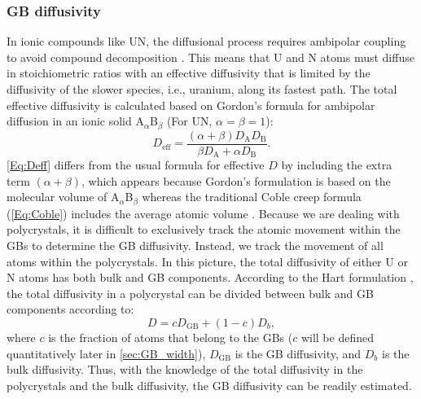 \documentclass[preprint,12pt,sort&compress]{elsarticle} %
\newcommand{\?}{\stackrel{?}{=}}
\providecommand{\DIFaddbegin}{\protect\color{blue}} %
\providecommand{\DIFaddend}{\protect\color{black}} %
\providecommand{\DIFdelbegin}{\protect\color{red}} %
\providecommand{\DIFdelend}{\protect\color{black}} %
\newcommand{\DIFscaledelfig}{0.5}
\newlength{\DIFdelgraphicswidth} %
\newlength{\DIFdelgraphicsheight} %
\newcommand{\DIFaddincludegraphics}[2][]{{\color{blue}\fbox{\DIFOincludegraphics[#1]{#2}}}} %
\newcommand{\DIFdelincludegraphics}[2][]{%
\sbox{\DIFdelgraphicsbox}{\DIFOincludegraphics[#1]{#2}}%
\settoboxwidth{\DIFdelgraphicswidth}{\DIFdelgraphicsbox} %
\settoboxtotalheight{\DIFdelgraphicsheight}{\DIFdelgraphicsbox} %
\scalebox{\DIFscaledelfig}{%
\parbox[b]{\DIFdelgraphicswidth}{\usebox{\DIFdelgraphicsbox}\\[-\baselineskip] \rule{\DIFdelgraphicswidth}{0em}}\llap{\resizebox{\DIFdelgraphicswidth}{\DIFdelgraphicsheight}{%
\setlength{\unitlength}{\DIFdelgraphicswidth}%
\begin{picture}(1,1)%
\thicklines\linethickness{2pt} %
{\color[rgb]{1,0,0}\put(0,0){\framebox(1,1){}}}%
{\color[rgb]{1,0,0}\put(0,0){\line( 1,1){1}}}%
{\color[rgb]{1,0,0}\put(0,1){\line(1,-1){1}}}%
\end{picture}%
}\hspace*{3pt}}} %
} %
\DeclareRobustCommand{\DIFaddbegin}{\DIFOaddbegin \let\includegraphics\DIFaddincludegraphics} %
\DeclareRobustCommand{\DIFaddend}{\DIFOaddend \let\includegraphics\DIFOincludegraphics} %
\DeclareRobustCommand{\DIFdelbegin}{\DIFOdelbegin \let\includegraphics\DIFdelincludegraphics} %
\DeclareRobustCommand{\DIFdelend}{\DIFOaddend \let\includegraphics\DIFOincludegraphics} %
\begin{document}
\subsubsection{GB diffusivity}
\label{Sec:GBD}


In ionic compounds like UN, the diffusional process requires ambipolar coupling to avoid compound decomposition \cite{Gordon1974}. This means that U and N atoms must diffuse in stoichiometric ratios with an effective diffusivity that is limited by the diffusivity of the slower species, i.e., uranium, along its fastest path. The total effective diffusivity is calculated based on Gordon's formula \cite{Gordon1974} for ambipolar diffusion in an ionic solid A$_{\alpha}$B$_{\beta}$ (For UN, $\alpha = \beta = 1$):
\begin{equation}
D_\mathrm{eff} = \frac{(\alpha + \beta) D_\mathrm{A} D_\mathrm{B} }{\beta D_\mathrm{A} + \alpha D_\mathrm{B}}.
\label{Eq:Deff}
\end{equation}
\cref{Eq:Deff} differs from the usual formula for effective $D$ by including the extra term $(\alpha + \beta)$, which appears because Gordon's formulation is based on the molecular volume of A$_{\alpha}$B$_{\beta}$ whereas the traditional Coble creep formula (\cref{Eq:Coble}) includes the average atomic volume \cite{Kizilyalli1999, Desai2008}. Because we are dealing with polycrystals, it is difficult to exclusively track the atomic movement within the GBs to determine the GB diffusivity. Instead, we track the movement of all atoms within the polycrystals. In this picture, the total diffusivity of either U or N atoms has both bulk and GB components. According to the Hart formulation \cite{Hart1957, Riet2021}, the total diffusivity in a polycrystal can be divided between bulk and GB components according to:
\DIFdelbegin %
\DIFdelend \DIFaddbegin \begin{equation}
D = c D_\mathrm{GB} + (1-c) D_b,
\end{equation}\DIFaddend 
where $c$ is the fraction of atoms that belong to the GBs ($c$ will be defined quantitatively later in \cref{sec:GB_width}), $D_\mathrm{GB}$ is the GB diffusivity, and $D_b$ is the bulk diffusivity. Thus, with the knowledge of the total diffusivity in the polycrystals and the bulk diffusivity, the GB diffusivity can be readily estimated. 
\end{document}
